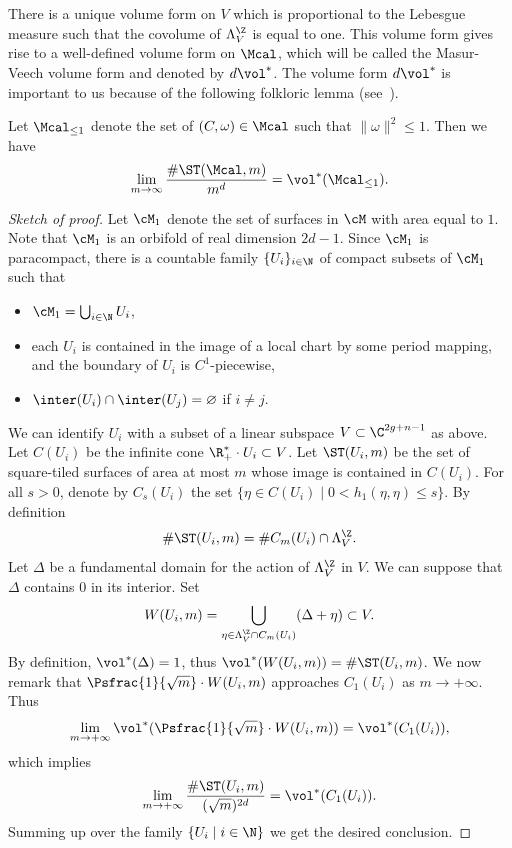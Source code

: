 There is a unique volume form on $V$ which is proportional to the Lebesgue measure such that the covolume of $\Lambda^\Z_V$ is equal to one.
This volume form gives rise to a well-defined volume form on $\Mcal$, which will be called the Masur-Veech volume form and denoted by $d\vol^*$.
The volume form $d\vol^*$ is important to us because of the following folkloric lemma (see~\cite[Prop.\,1.6]{EO01}).

\begin{Lemma}\label{lm:MV:vol:count}
Let $\Mcal_{\leq 1}$ denote the set of $(C,\omega)\in \Mcal$ such that $\|\omega\|^2\leq 1$. Then we have
\[
\lim_{m\to \infty}\frac{\#\ST(\Mcal,m)}{m^d}=\vol^*(\Mcal_{\leq 1}).
\]
\end{Lemma}
\begin{proof}[Sketch of proof]
Let $\cM_1$ denote the set of surfaces in $\cM$ with area equal to $1$. Note that $\cM_1$ is an orbifold of real dimension $2d-1$.
Since $\cM_1$ is paracompact, there is a countable family $\{U_i\}_{i\in \N}$ of compact subsets of $\cM_1$ such that
\begin{itemize}
\item
$\cM_1=\bigcup_{i\in \N}U_i$,

\item
each $U_i$ is contained in the image of a local chart by some period mapping, and the boundary of $U_i$ is $C^1$-piecewise,

\item
$\inter(U_i)\cap\inter(U_j)=\varnothing$ if $i\neq j$.
\end{itemize}
We can identify $U_i$ with a subset of a linear subspace $V\subset \C^{2g+n-1}$ as above.
Let $C(U_i)$ be the infinite cone $\R^*_+\cdot U_i \subset V$.
Let $\ST(U_i,m)$ be the set of square-tiled surfaces of area at most $m$ whose image is contained in $C(U_i)$.
For all $s >0$, denote by $C_s(U_i)$ the set $\{\eta \in C(U_i)\mid 0< h_1(\eta,\eta) \leq s\}$.
By definition
\[
\#\ST(U_i,m)=\#C_m(U_i)\cap\Lambda^\Z_V.
\]
Let $\Delta$ be a fundamental domain for the action of $\Lambda^\Z_V$ in $V$.
We can suppose that $\Delta$ contains $0$ in its interior.
Set
\[
W(U_i,m)=\bigcup_{\eta\in\Lambda^{\Z}_V\cap C_{m}(U_i)}(\Delta+\eta) \subset V.
\]
By definition, $\vol^*(\Delta)=1$, thus $\vol^*(W(U_i,m))=\#\ST(U_i,m)$.
We now remark that $\Psfrac{1}{\sqrt{m}}\cdot W(U_i,m)$ approaches $C_1(U_i)$ as $m \to +\infty$. Thus
\[
\lim_{m \to +\infty}\vol^*(\Psfrac{1}{\sqrt{m}}\cdot W(U_i,m))= \vol^*(C_{1}(U_i)),
\]
which implies
\[
\lim_{m\to +\infty}\frac{\#\ST(U_i,m)}{(\sqrt{m})^{2d}}=\vol^*(C_1(U_i)).
\]
Summing up over the family $\{U_i\mid i \in \N\}$ we get the desired conclusion.
\end{proof}

